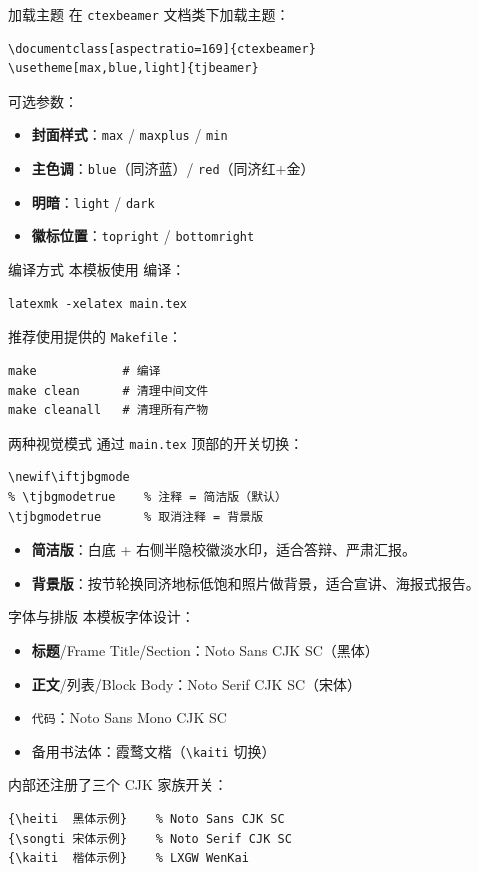 \begin{frame}[fragile]{加载主题}
  在 \texttt{ctexbeamer} 文档类下加载主题：
\begin{lstlisting}
\documentclass[aspectratio=169]{ctexbeamer}
\usetheme[max,blue,light]{tjbeamer}
\end{lstlisting}
  可选参数：
  \begin{itemize}
    \item \textbf{封面样式}：\texttt{max} / \texttt{maxplus} / \texttt{min}
    \item \textbf{主色调}：\texttt{blue}（同济蓝）/ \texttt{red}（同济红+金）
    \item \textbf{明暗}：\texttt{light} / \texttt{dark}
    \item \textbf{徽标位置}：\texttt{topright} / \texttt{bottomright}
  \end{itemize}
\end{frame}

\begin{frame}[fragile]{编译方式}
  本模板使用 \XeLaTeX{} 编译：
\begin{lstlisting}
latexmk -xelatex main.tex
\end{lstlisting}
  推荐使用提供的 \texttt{Makefile}：
\begin{lstlisting}
make            # 编译
make clean      # 清理中间文件
make cleanall   # 清理所有产物
\end{lstlisting}
\end{frame}

\begin{frame}[fragile]{两种视觉模式}
  通过 \texttt{main.tex} 顶部的开关切换：
\begin{lstlisting}
\newif\iftjbgmode
% \tjbgmodetrue    % 注释 = 简洁版（默认）
\tjbgmodetrue      % 取消注释 = 背景版
\end{lstlisting}
  \begin{itemize}
    \item \textbf{简洁版}：白底 + 右侧半隐校徽淡水印，适合答辩、严肃汇报。
    \item \textbf{背景版}：按节轮换同济地标低饱和照片做背景，适合宣讲、海报式报告。
  \end{itemize}
\end{frame}

\begin{frame}[fragile]{字体与排版}
  本模板字体设计：
  \begin{itemize}
    \item \textbf{标题}/Frame Title/Section：\textsf{Noto Sans CJK SC}（黑体）
    \item \textbf{正文}/列表/Block Body：Noto Serif CJK SC（宋体）
    \item \texttt{代码}：Noto Sans Mono CJK SC
    \item 备用书法体：\kaiti 霞鹜文楷（\texttt{\textbackslash{}kaiti} 切换）
  \end{itemize}
  内部还注册了三个 CJK 家族开关：
\begin{lstlisting}
{\heiti  黑体示例}    % Noto Sans CJK SC
{\songti 宋体示例}    % Noto Serif CJK SC
{\kaiti  楷体示例}    % LXGW WenKai
\end{lstlisting}
\end{frame}

